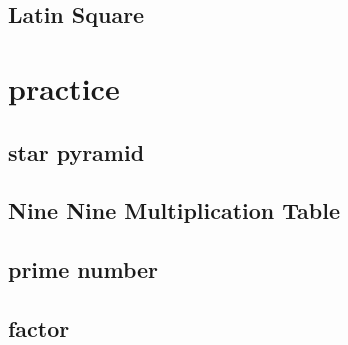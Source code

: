     \subsection{Latin Square}
        

\section{practice}
    \subsection{star pyramid}
            
    \subsection{Nine Nine Multiplication Table}
        
    \subsection{prime number}
        
    \subsection{factor}
        